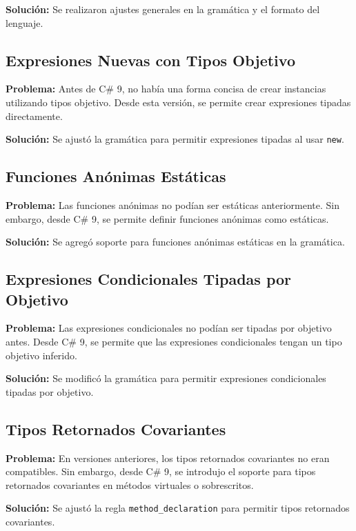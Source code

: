 \textbf{Solución:} Se realizaron ajustes generales en la gramática y el formato del lenguaje.

\subsection{Expresiones Nuevas con Tipos Objetivo}

\textbf{Problema:} Antes de C\# 9, no había una forma concisa de crear instancias utilizando tipos objetivo. Desde esta versión, se permite crear expresiones tipadas directamente.

\textbf{Solución:} Se ajustó la gramática para permitir expresiones tipadas al usar \texttt{new}.

\subsection{Funciones Anónimas Estáticas}

\textbf{Problema:} Las funciones anónimas no podían ser estáticas anteriormente. Sin embargo, desde C\# 9, se permite definir funciones anónimas como estáticas.

\textbf{Solución:} Se agregó soporte para funciones anónimas estáticas en la gramática.

\subsection{Expresiones Condicionales Tipadas por Objetivo}

\textbf{Problema:} Las expresiones condicionales no podían ser tipadas por objetivo antes. Desde C\# 9, se permite que las expresiones condicionales tengan un tipo objetivo inferido.

\textbf{Solución:} Se modificó la gramática para permitir expresiones condicionales tipadas por objetivo.

\subsection{Tipos Retornados Covariantes}

\textbf{Problema:} En versiones anteriores, los tipos retornados covariantes no eran compatibles. Sin embargo, desde C\# 9, se introdujo el soporte para tipos retornados covariantes en métodos virtuales o sobrescritos.

\textbf{Solución:} Se ajustó la regla \texttt{method\_declaration} para permitir tipos retornados covariantes.

